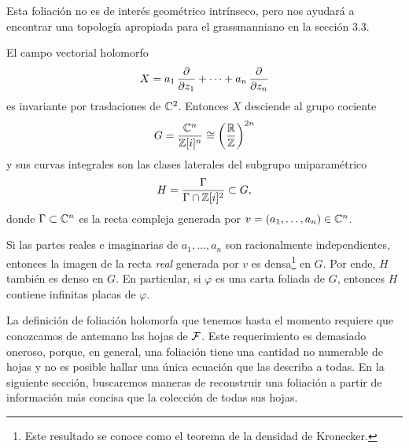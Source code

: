 \begin{remark}
Esta foliación no es de interés geométrico intrínseco, pero nos ayudará a encontrar una topología apropiada para el grassmanniano en la sección 3.3.
\end{remark}

\begin{example}
El campo vectorial holomorfo
$$X = a_1 \, \dfrac \partial {\partial z_1} + \dots + a_n \, \dfrac \partial {\partial z_n}$$
es invariante por traslaciones de $\mathbb C^2$. Entonces $X$ desciende al grupo cociente
$$G = \dfrac {\mathbb C^n} {\mathbb Z[i]^n} \cong \left( \dfrac {\mathbb R} {\mathbb Z} \right)^{2n}$$
y sus curvas integrales son las clases laterales del subgrupo uniparamétrico
$$H = \dfrac \Gamma {\Gamma \cap \mathbb Z[i]^2} \subset G,$$
donde $\Gamma \subset \mathbb C^n$ es la recta compleja generada por $v = (a_1, \dots, a_n) \in \mathbb C^n$.

Si las partes reales e imaginarias de $a_1, \dots, a_n$ son racionalmente independientes, entonces la imagen de la recta \textit{real} generada por $v$ es densa\footnote{Este resultado se conoce como el teorema de la densidad de Kronecker.} en $G$. Por ende, $H$ también es denso en $G$. En particular, si $\varphi$ es una carta foliada de $G$, entonces $H$ contiene infinitas placas de $\varphi$.
\end{example}

La definición de foliación holomorfa que tenemos hasta el momento requiere que conozcamos de antemano las hojas de $\mathcal F$. Este requerimiento es demasiado oneroso, porque, en general, una foliación tiene una cantidad no numerable de hojas y no es posible hallar una única ecuación que las describa a todas. En la siguiente sección, buscaremos maneras de reconstruir una foliación a partir de información más concisa que la colección de todas sus hojas.
